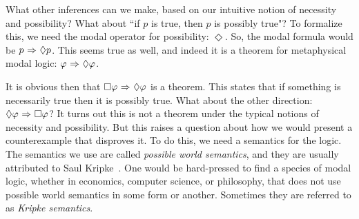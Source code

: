 What other inferences can we make, based on our intuitive notion of necessity and possibility? What about ``if $p$ is true, then $p$ is possibly true"? To formalize this, we need the modal operator for possibility: $\Diamond$. So, the modal formula would be $p {\ \Rightarrow \ } \Diamond p$. This seems true as well, and indeed it is a theorem for metaphysical modal logic: $\varphi {\ \Rightarrow \ } \Diamond \varphi$. 

	

It is obvious then that $\Box \varphi {\ \Rightarrow \ } \Diamond \varphi$ is a theorem. This states that if something is necessarily true then it is possibly true. What about the other direction: $\Diamond \varphi {\ \Rightarrow \ } \Box \varphi$? It turns out this is not a theorem under the typical notions of necessity and possibility. But this raises a question about how we would present a counterexample that disproves it. To do this, we need a semantics for the logic. The semantics we use are called \emph{possible world semantics}, and they are usually attributed to Saul Kripke~\cite{Kripke}. One would be hard-pressed to find a species of modal logic, whether in economics, computer science, or philosophy, that does not use possible world semantics in some form or another. Sometimes they are referred to as \emph{Kripke semantics}.

